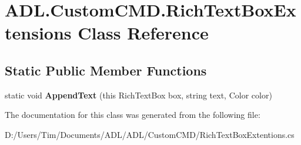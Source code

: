 \hypertarget{class_a_d_l_1_1_custom_c_m_d_1_1_rich_text_box_extensions}{}\section{A\+D\+L.\+Custom\+C\+M\+D.\+Rich\+Text\+Box\+Extensions Class Reference}
\label{class_a_d_l_1_1_custom_c_m_d_1_1_rich_text_box_extensions}
\subsection*{Static Public Member Functions}
\begin{DoxyCompactItemize}
\item 
\mbox{\label{class_a_d_l_1_1_custom_c_m_d_1_1_rich_text_box_extensions_a47d508f47f347c3631bcfeb940b080e3}} 
static void {\bfseries Append\+Text} (this Rich\+Text\+Box box, string text, Color color)
\end{DoxyCompactItemize}


The documentation for this class was generated from the following file\+:\begin{DoxyCompactItemize}
\item 
D\+:/\+Users/\+Tim/\+Documents/\+A\+D\+L/\+A\+D\+L/\+Custom\+C\+M\+D/Rich\+Text\+Box\+Extentions.\+cs\end{DoxyCompactItemize}
